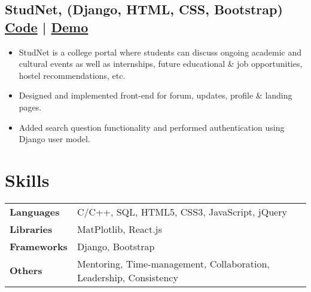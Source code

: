 \documentclass[a4,10pt]{article}
\newenvironment{zitemize}{
\begin{itemize}\itemsep0pt \parskip0pt \parsep1pt}
{\end{itemize}\vspace{-0.5cm}}
\newcommand{\hskills}[1]{
\textbf{\bfseries #1} }
\begin{document}
\subsection*{StudNet, {\normalsize\normalfont (Django, HTML, CSS, Bootstrap)} \hfill {\href{https://github.com/DevelopersLeague/StudNet}{Code} } | {\href{https://stud-net.herokuapp.com/}{Demo} }} 
    \begin{zitemize}
        \item StudNet is a college portal where students can discuss ongoing academic and cultural events as well as 
        internships, future educational \& job opportunities, hostel recommendations, etc. 
        \item Designed and implemented front-end for forum, updates, profile \& landing pages.
        \item Added search question functionality and performed authentication using Django user model.
    \end{zitemize}




\section{Skills}
\begin{tabular}{p{7em} p{48em}}
\hskills{Languages} &  C/C++, SQL, HTML5, CSS3, JavaScript, jQuery \\
\hskills{Libraries} & MatPlotlib, React.js  \\
\hskills{Frameworks} & Django, Bootstrap \\
\hskills{Others} & Mentoring, Time-management, Collaboration, Leadership, Consistency
\end{tabular}
\vspace{-0.2cm}



\end{document}
